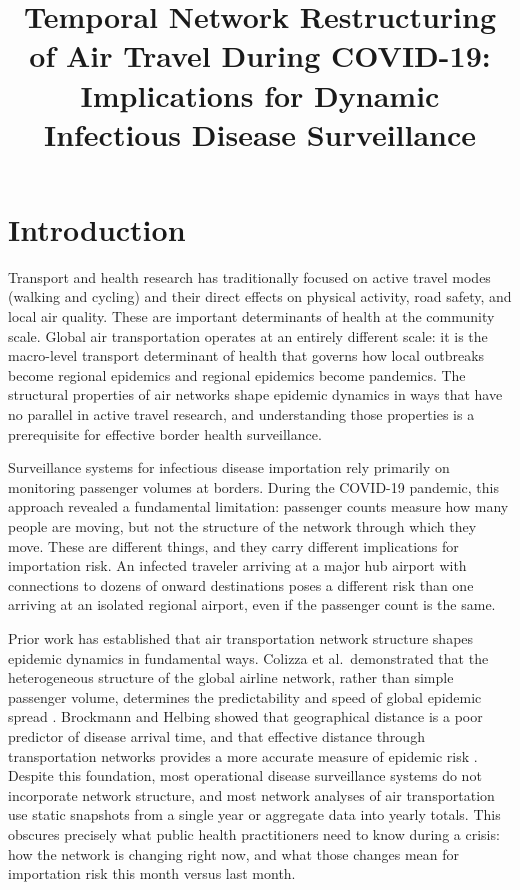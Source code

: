 \documentclass{elsarticle}
\begin{document}
\title{Temporal Network Restructuring of Air Travel During COVID-19: Implications for Dynamic Infectious Disease Surveillance}


\begin{abstract}
\end{abstract}

\maketitle

\section{Introduction}

Transport and health research has traditionally focused on active travel modes (walking and cycling) and their direct effects on physical activity, road safety, and local air quality. These are important determinants of health at the community scale. Global air transportation operates at an entirely different scale: it is the macro-level transport determinant of health that governs how local outbreaks become regional epidemics and regional epidemics become pandemics. The structural properties of air networks shape epidemic dynamics in ways that have no parallel in active travel research, and understanding those properties is a prerequisite for effective border health surveillance.

Surveillance systems for infectious disease importation rely primarily on monitoring passenger volumes at borders. During the COVID-19 pandemic, this approach revealed a fundamental limitation: passenger counts measure how many people are moving, but not the structure of the network through which they move. These are different things, and they carry different implications for importation risk. An infected traveler arriving at a major hub airport with connections to dozens of onward destinations poses a different risk than one arriving at an isolated regional airport, even if the passenger count is the same.

Prior work has established that air transportation network structure shapes epidemic dynamics in fundamental ways. Colizza et al.\ demonstrated that the heterogeneous structure of the global airline network, rather than simple passenger volume, determines the predictability and speed of global epidemic spread \cite{colizza2006}. Brockmann and Helbing showed that geographical distance is a poor predictor of disease arrival time, and that effective distance through transportation networks provides a more accurate measure of epidemic risk \cite{brockmann2013}. Despite this foundation, most operational disease surveillance systems do not incorporate network structure, and most network analyses of air transportation use static snapshots from a single year or aggregate data into yearly totals. This obscures precisely what public health practitioners need to know during a crisis: how the network is changing right now, and what those changes mean for importation risk this month versus last month.
\end{document}
